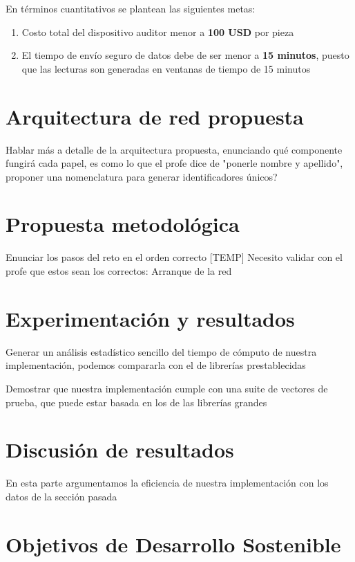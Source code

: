 \documentclass{article}
\begin{document}
        En términos cuantitativos se plantean las siguientes metas:
        \begin{enumerate}
            \item Costo total del dispositivo auditor menor a \textbf{100 USD} por pieza
            \item El tiempo de envío seguro de datos debe de ser menor a \textbf{15 minutos}, puesto que las lecturas son generadas en ventanas de tiempo de 15 minutos
        \end{enumerate}

    \section{Arquitectura de red propuesta}

        Hablar más a detalle de la arquitectura propuesta, enunciando qué componente fungirá cada papel, es como lo que el profe dice de "ponerle nombre y apellido", proponer una nomenclatura para generar identificadores únicos?

    \section{Propuesta metodológica}

        Enunciar los pasos del reto en el orden correcto
        [TEMP] Necesito validar con el profe que estos sean los correctos:
        Arranque de la red

    \section{Experimentación y resultados}

        Generar un análisis estadístico sencillo del tiempo de cómputo de nuestra implementación, podemos compararla con el de librerías prestablecidas

        Demostrar que nuestra implementación cumple con una suite de vectores de prueba, que puede estar basada en los de las librerías grandes

    \section{Discusión de resultados}

        En esta parte argumentamos la eficiencia de nuestra implementación con los datos de la sección pasada

    \section{Objetivos de Desarrollo Sostenible}
\end{document}
